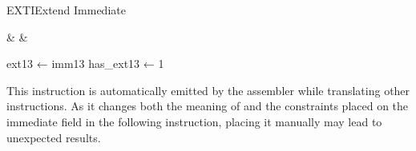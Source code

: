 \begin{instruction}{EXTI}{Extend Immediate}
  \begin{encoding}
    \mnemonic &  &  \\
  \end{encoding}
\begin{operation}
ext13 ← imm13
has\_ext13 ← 1
\end{operation}
  \begin{remarks}This instruction is automatically emitted by the assembler while translating other instructions. As it changes both the meaning of and the constraints placed on the immediate field in the following instruction, placing it manually may lead to unexpected results.\end{remarks}
\end{instruction}
